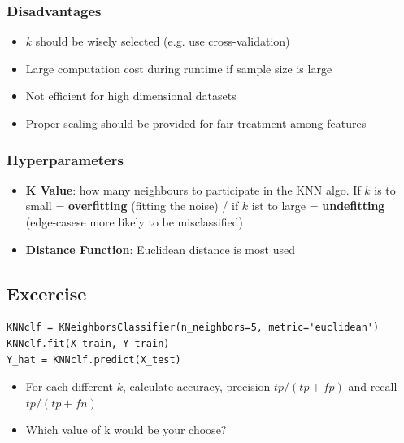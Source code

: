 \subsubsection{Disadvantages}
\begin{itemize}
    \item $k$ should be wisely selected (e.g. use cross-validation)
    \item Large computation cost during runtime if sample size is large
    \item Not efficient for high dimensional datasets
    \item Proper scaling should be provided for fair treatment among features
\end{itemize}

\subsubsection{Hyperparameters}
\begin{itemize}
    \item \textbf{K Value}: how many neighbours to participate in the KNN algo. If $k$ is to small = \textbf{overfitting} (fitting the noise) / if $k$ ist to large = \textbf{undefitting} (edge-casese more likely to be misclassified)
    \item \textbf{Distance Function}: Euclidean distance is most used
\end{itemize}

\subsection{Excercise}
\begin{verbatim}
KNNclf = KNeighborsClassifier(n_neighbors=5, metric='euclidean')
KNNclf.fit(X_train, Y_train)
Y_hat = KNNclf.predict(X_test)
\end{verbatim}
\begin{itemize}
    \item For each different $k$, calculate accuracy, precision $tp/(tp+fp)$ and recall $tp/(tp+fn)$
    \item Which value of k would be your choose?
\end{itemize}